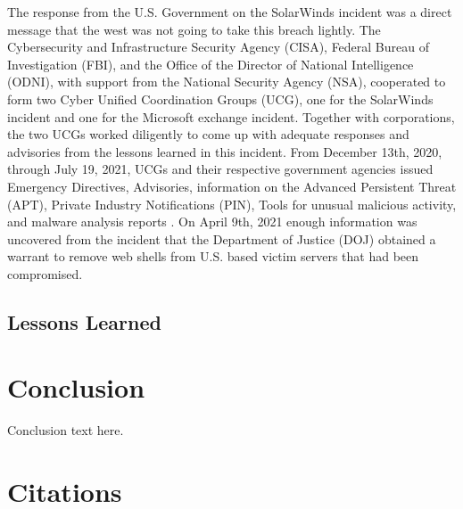 \documentclass[conference]{IEEEtran}
\begin{document}
The response from the U.S. Government on the SolarWinds incident was a direct message that the west was not going to take
this breach lightly. The Cybersecurity and Infrastructure Security Agency (CISA), Federal Bureau of Investigation (FBI), and the
Office of the Director of National Intelligence (ODNI), with support from the National Security Agency (NSA),
cooperated to form two Cyber Unified Coordination Groups (UCG), one for the SolarWinds incident and one for the
Microsoft exchange incident. Together with corporations, the two UCGs worked diligently to come up with adequate responses
and advisories from the lessons learned in this incident. From December 13th, 2020, through July 19, 2021, UCGs and their
respective government agencies issued Emergency Directives, Advisories, information on the Advanced Persistent Threat (APT),
Private Industry Notifications (PIN), Tools for unusual malicious activity, and malware analysis reports
\cite{GAOSolarWindsExchange}. On April 9th, 2021 enough information was uncovered from the incident that the Department
of Justice (DOJ) obtained a warrant to remove web shells from U.S. based victim servers that had been compromised.       
    \subsection{Lessons Learned}


\section{Conclusion}


Conclusion text here.

\section*{Citations}
\end{document}
